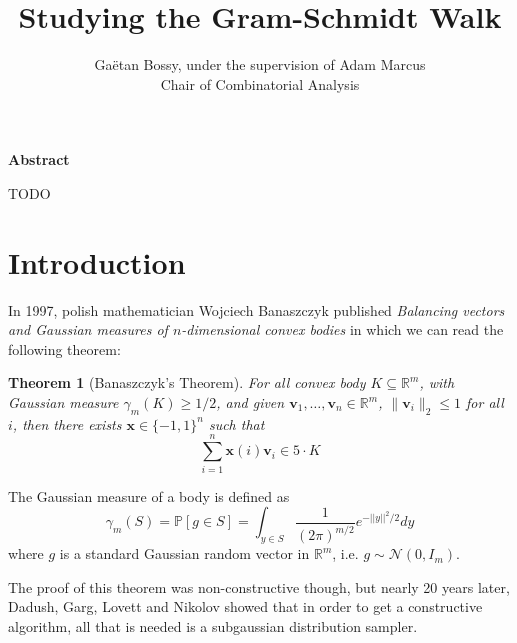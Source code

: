 \documentclass[12pt]{article}
\title{Studying the Gram-Schmidt Walk}
\author{Gaëtan Bossy, under the supervision of Adam Marcus\\Chair of Combinatorial Analysis}
\newtheorem{theorem}{Theorem}
\begin{document}
\maketitle
\begin{center}\bf Abstract\end{center}
\small TODO


\section{Introduction}
In 1997, polish mathematician Wojciech Banaszczyk published \textit{Balancing vectors and Gaussian measures of $n$-dimensional convex bodies}\cite{banaszczyk1998balancing} in which we can read the following theorem:
\begin{theorem}[Banaszczyk's Theorem]
For all convex body $K \subseteq \mathbb{R}^m$, with Gaussian measure $\gamma_m(K)\geq 1/2$, and given $\textbf{v}_1, \dots, \textbf{v}_n \in \mathbb{R}^m$, $\|\textbf{v}_i\|_2 \leq 1$ for all $i$, then there exists $ \textbf{x} \in \{-1, 1\}^n$ such that
$$\sum_{i=1}^n \textbf{x}(i)\textbf{v}_i \in 5 \cdot K $$
\end{theorem}
The Gaussian measure of a body is defined as $$\gamma_m(S) = \mathbb{P}[g \in S] = \int_{y \in S} \frac{1}{(2 \pi)^{m/2}} e^{-||y||^2/2} dy$$
    where $g$ is a standard Gaussian random vector in $\mathbb{R}^m$, i.e. $g \sim \mathcal{N}(0, I_m)$. 

The proof of this theorem was non-constructive though, but nearly 20 years later, Dadush, Garg, Lovett and Nikolov showed that in order to get a constructive algorithm, all that is needed is a subgaussian distribution sampler. 
\end{document}
